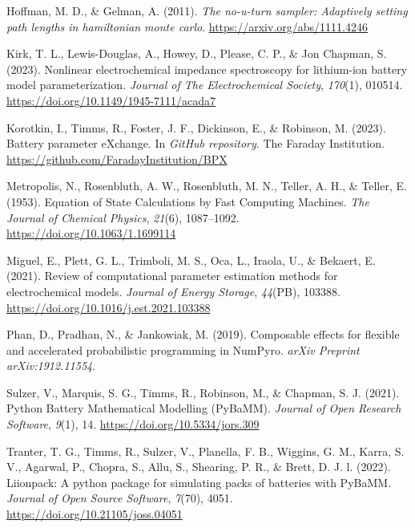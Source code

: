 \documentclass[
]{article}
\newlength{\cslhangindent}
\newenvironment{CSLReferences}[2] %
 {\begin{list}{}{%
  \setlength{\itemindent}{0pt}
  \setlength{\leftmargin}{0pt}
  \setlength{\parsep}{0pt}
  \ifodd #1
   \setlength{\leftmargin}{\cslhangindent}
   \setlength{\itemindent}{-1\cslhangindent}
  \fi
  \setlength{\itemsep}{#2\baselineskip}}}
 {\end{list}}
\begin{document}
\begin{CSLReferences}{1}{0}
Hoffman, M. D., \& Gelman, A. (2011). \emph{The no-u-turn sampler:
Adaptively setting path lengths in hamiltonian monte carlo}.
\url{https://arxiv.org/abs/1111.4246}

Kirk, T. L., Lewis-Douglas, A., Howey, D., Please, C. P., \& Jon
Chapman, S. (2023). Nonlinear electrochemical impedance spectroscopy for
lithium-ion battery model parameterization. \emph{Journal of The
Electrochemical Society}, \emph{170}(1), 010514.
\url{https://doi.org/10.1149/1945-7111/acada7}

Korotkin, I., Timms, R., Foster, J. F., Dickinson, E., \& Robinson, M.
(2023). Battery parameter eXchange. In \emph{GitHub repository}. The
Faraday Institution. \url{https://github.com/FaradayInstitution/BPX}

Metropolis, N., Rosenbluth, A. W., Rosenbluth, M. N., Teller, A. H., \&
Teller, E. (1953). Equation of {State} {Calculations} by {Fast}
{Computing} {Machines}. \emph{The Journal of Chemical Physics},
\emph{21}(6), 1087--1092. \url{https://doi.org/10.1063/1.1699114}

Miguel, E., Plett, G. L., Trimboli, M. S., Oca, L., Iraola, U., \&
Bekaert, E. (2021). Review of computational parameter estimation methods
for electrochemical models. \emph{Journal of Energy Storage},
\emph{44}(PB), 103388. \url{https://doi.org/10.1016/j.est.2021.103388}

Phan, D., Pradhan, N., \& Jankowiak, M. (2019). Composable effects for
flexible and accelerated probabilistic programming in NumPyro.
\emph{arXiv Preprint arXiv:1912.11554}.

Sulzer, V., Marquis, S. G., Timms, R., Robinson, M., \& Chapman, S. J.
(2021). {Python Battery Mathematical Modelling (PyBaMM)}. \emph{Journal
of Open Research Software}, \emph{9}(1), 14.
\url{https://doi.org/10.5334/jors.309}

Tranter, T. G., Timms, R., Sulzer, V., Planella, F. B., Wiggins, G. M.,
Karra, S. V., Agarwal, P., Chopra, S., Allu, S., Shearing, P. R., \&
Brett, D. J. l. (2022). Liionpack: A python package for simulating packs
of batteries with PyBaMM. \emph{Journal of Open Source Software},
\emph{7}(70), 4051. \url{https://doi.org/10.21105/joss.04051}


\end{CSLReferences}
\end{document}
